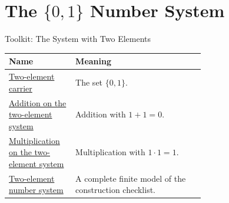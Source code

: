 \section{\texorpdfstring{The \(\{0,1\}\) Number System}{The 0,1 Number System}}
\begin{toolkitbox}{Toolkit: The System with Two Elements}
\small
\renewcommand{\arraystretch}{1.35}
\begin{tabular}{@{} l p{0.66\linewidth} @{}}
\toprule
\textbf{Name} & \textbf{Meaning} \\
\midrule
\hyperref[def:two-element-carrier]{Two-element carrier}
  & The set \(\{0,1\}\). \\
\hyperref[def:addition-on-two-element-system]{Addition on the two-element system}
  & Addition with \(1+1=0\). \\
\hyperref[def:multiplication-on-two-element-system]{Multiplication on the two-element system}
  & Multiplication with \(1\cdot 1=1\). \\
\hyperref[def:two-element-number-system]{Two-element number system}
  & A complete finite model of the construction checklist. \\
\bottomrule
\end{tabular}
\end{toolkitbox}


